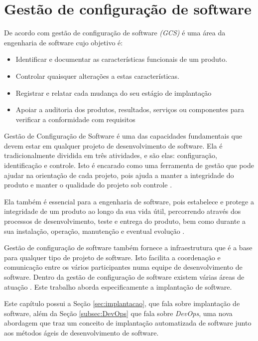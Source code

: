 \chapter{Gestão de configuração de software}
\label{cap-referencial}

De acordo com  gestão de configuração de software \textit{(GCS)} 
é uma área da engenharia de software cujo objetivo é:

\begin{itemize}
  \item Identificar e documentar as características funcionais de
  um produto.
  \item Controlar quaisquer alterações a estas características.
  \item Registrar e relatar cada mudança do seu estágio de implantação
  \item Apoiar a auditoria dos produtos, resultados, serviços ou
componentes para verificar a conformidade com requisitos

\end{itemize}

Gestão de Configuração de Software é uma das capacidades fundamentais que devem
estar em qualquer projeto de desenvolvimento de software. Ela é
tradicionalmente dividida em três atividades, e são elas: configuração,
identificação e controle. Isto é encarado como uma ferramenta de
gestão que pode ajudar na orientação de cada projeto, pois ajuda a manter a
integridade do produto e manter o qualidade do projeto sob controle \cite{gcs}. 

Ela também é essencial para a engenharia de software, pois estabelece e protege a
integridade de um produto ao longo da sua vida útil, percorrendo através dos
processos de desenvolvimento, teste e entrega do produto, bem como
durante a sua instalação, operação, manutenção e eventual evolução \cite{ieegcs}.

Gestão de configuração de software também fornece a infraestrutura que é a base para
qualquer tipo de projeto de software. Isto facilita a coordenação e comunicação
entre os vários participantes numa equipe de desenvolvimento de software.
Dentro da gestão de configuração de software
existem várias áreas de atuação \cite{gcs}. Este trabalho aborda especificamente a 
implantação de software.

Este capítulo possui a Seção \ref{sec:implantacao}, que fala sobre
implantação de software, além da Seção \ref{subsec:DevOps} que fala sobre 
\textit{DevOps}, uma
nova abordagem que traz um conceito de implantação
automatizada de software junto aos métodos ágeis de desenvolvimento de software. 

